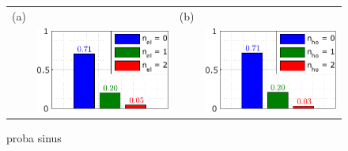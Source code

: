 \begin{figure}[hptb]
	\begin{center}
		\begin{tabular}{c c c c}
			(a) & & (b) & \\ 
			& \includegraphics[width = 6.5 cm]{./appC/JnlData_sinus_Projected_Gradient_Method_proba_el} & & \includegraphics[width = 6.5 cm]{./appC/JnlData_sinus_Projected_Gradient_Method_proba_ho}
		\end{tabular}
	\end{center}
	
	\caption{proba sinus}
	\label{fig: proba sinus}
\end{figure}



